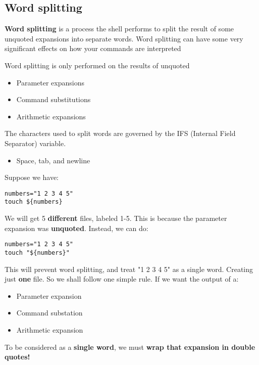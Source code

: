 \documentclass{report}
\begin{document}
  \pagebreak \bigbreak \noindent 
  \subsection{Word splitting}
  \bigbreak \noindent 
  \begin{concept}
     \textbf{Word splitting}  is a process the shell performs to split the result of some unquoted expansions into separate words. Word splitting can have some very significant effects on how your commands are interpreted
  \end{concept}
  \bigbreak \noindent 
  Word splitting is only performed on the results of unquoted 
  \begin{itemize}
      \item Parameter expansions
        \item Command substitutions
        \item Arithmetic expansions
  \end{itemize}
  \bigbreak \noindent 
  The characters used to split words are governed by the IFS (Internal Field Separator) variable.
  \begin{itemize}
      \item Space, tab, and newline
  \end{itemize}
  \bigbreak \noindent 
  Suppose we have:
  \begin{mdframed}[style=purplebox]
  \begin{verbatim}
numbers="1 2 3 4 5"
touch ${numbers}
  \end{verbatim}
  \bigbreak \noindent
  \end{mdframed}
  \bigbreak \noindent 
  We will get 5 \textbf{different} files, labeled 1-5. This is because the parameter expansion was \textbf{unquoted}. Instead, we can do:
  \begin{mdframed}[style=purplebox]
  \begin{verbatim}
numbers="1 2 3 4 5"
touch "${numbers}"
  \end{verbatim}
  \bigbreak \noindent
  \end{mdframed}
  \bigbreak \noindent 
  This will prevent word splitting, and treat "1 2 3 4 5" as a single word. Creating just \textbf{one} file.
  \bigbreak \noindent 
  So we shall follow one simple rule. If we want the output of a:
  \begin{itemize}
      \item Parameter expansion 
        \item Command substation
        \item Arithmetic expansion
  \end{itemize}
  \bigbreak \noindent 
  To be considered as a \textbf{single word}, we must \textbf{wrap that expansion in double quotes!}
\end{document}
